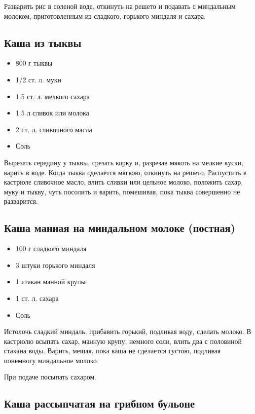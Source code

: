 Разварить рис в соленой воде, откинуть на решето и подавать с миндальным молоком, приготовленным из сладкого, горького миндаля и сахара.

\subsection{Каша из тыквы}

\begin{itemize}
	\item 800 г тыквы
    \item 1/2 ст. л. муки 
    \item 1.5 ст. л. мелкого сахара 
    \item 1.5 л сливок или молока 
    \item 2 ст. л. сливочного масла
    \item Соль
\end{itemize}

Вырезать середину у тыквы, срезать корку и, разрезав мякоть на мелкие куски, варить в воде. Когда тыква сделается мягкою, откинуть на решето. Распустить в кастрюле сливочное масло, влить сливки или цельное молоко, положить сахар, муку и тыкву, чуть посолить и варить, помешивая, пока тыква совершенно не разварится.

\subsection{Каша манная на миндальном молоке (постная)}

\begin{itemize}
	\item 100 г сладкого миндаля 
    \item 3 штуки горького миндаля 
    \item 1 стакан манной крупы 
    \item 1 ст. л. сахара 
    \item Соль
\end{itemize}

Истолочь сладкий миндаль, прибавить горький, подливая воду, сделать молоко. В кастрюлю всыпать сахар, манную крупу, немного соли, влить два с половиной стакана воды. Варить, мешая, пока каша не сделается густою, подливая понемногу миндальное молоко.

При подаче посыпать сахаром.

\subsection{Каша рассыпчатая на грибном бульоне}

